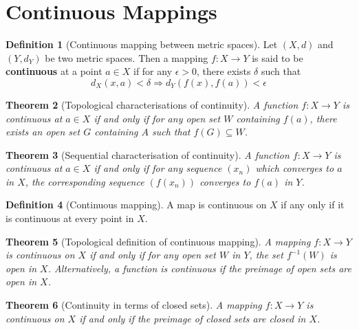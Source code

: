 \documentclass[10pt, oneside, reqno]{amsart}
\theoremstyle{plain}%
\newtheorem{thm}{Theorem}[section]
\theoremstyle{definition}
\newtheorem{defn}[thm]{Definition}
\theoremstyle{remark}
\newcommand{\met}{(X,d)}
\begin{document}



\section{Continuous Mappings} %
\label{sec:continuous_mappings}

\begin{defn}[Continuous mapping between metric spaces]
    Let $\met$ and $(Y, d_Y)$ be two metric spaces.  Then a mapping $f : X \rightarrow Y$ is said to be \textbf{continuous} at a point $a \in X$ if for any $\epsilon > 0$, there exists $\delta$ such that \[
        d_X(x,a) < \delta \Rightarrow d_Y(f(x), f(a)) < \epsilon
    \]
\end{defn}

\begin{thm}[Topological characterisations of continuity]
    A function $f : X \rightarrow Y$ is continuous at $a \in X$ if and only if for any open set $W$ containing $f(a)$, there exists an open set $G$ containing $A$ such that $f(G) \subseteq W$.  
\end{thm}

\begin{thm}[Sequential characterisation of continuity]
    A function $f: X \rightarrow Y$ is continuous at $a \in X$ if and only if for any sequence $(x_n)$ which converges to $a$ in $X$, the corresponding sequence $(f(x_n))$ converges to $f(a)$ in $Y$.
\end{thm}


\begin{defn}[Continuous mapping]
    A map is continuous on $X$ if any only if it is continuous at every point in $X$.
\end{defn}

\begin{thm}[Topological definition of continuous mapping]
    A mapping $f: X \rightarrow Y$ is continuous on $X$ if and only if for any open set $W$ in $Y$, the set $f^{-1}(W)$ is open in $X$. Alternatively, a function is continuous if the preimage of open sets are open in $X$.
\end{thm}

\begin{thm}[Continuity in terms of closed sets]
    A mapping $f: X \rightarrow Y$ is continuous on $X$ if and only if the preimage of closed sets are closed in $X$.
\end{thm}

\end{document}
